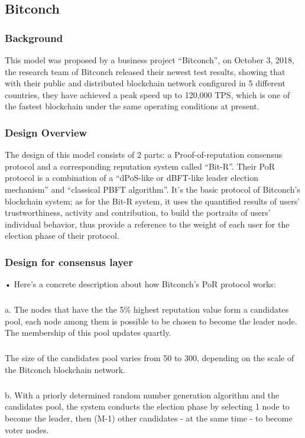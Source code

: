 \documentclass[doublespacing]{bmcart}
\begin{document}
\begin{CJK*}{UTF8}{gbsn}
	\subsection{Bitconch} 
	\subsubsection*{Background} 
	This model was proposed by a business project ``Bitconch'', on October 3, 2018, the research team of Bitconch released their newest test results, showing that with their public and distributed blockchain network configured in 5 different countries, they have achieved a peak speed up to 120,000 TPS, which is one of the fastest blockchain under the same operating conditions at present.  
	\subsubsection*{Design Overview}  
	The design of this model consists of 2 parts: a Proof-of-reputation consensus protocol and a corresponding reputation system called ``Bit-R''. Their PoR protocol is a combination of a ``dPoS-like or dBFT-like leader election mechanism'' and ``classical PBFT algorithm''. It's the basic protocol of Bitconch's blockchain system; as for the Bit-R system, it uses the quantified results of users' trustworthiness, activity and contribution, to build the portraits of users' individual behavior, thus provide a reference to the weight of each user for the election phase of their protocol.
	\subsubsection*{Design for consensus layer} 
	• Here's a concrete description about how Bitconch's PoR protocol works:
	\subparagraph{} 
	a. The nodes that have the the 5\% highest reputation value form a candidates pool, each node among them is possible to be chosen to become the leader node. The membership of this pool updates quartly.
	\subparagraph{} 
	The size of the candidates pool varies from 50 to 300, depending on the scale of the Bitconch blockchain network.
	\subparagraph{} 
	b. With a priorly determined random number generation algorithm and the candidates pool, the system conducts the election phase by selecting 1 node to become the leader, then (M-1) other candidates - at the same time - to become voter nodes.

\end{CJK*}
\end{document}
